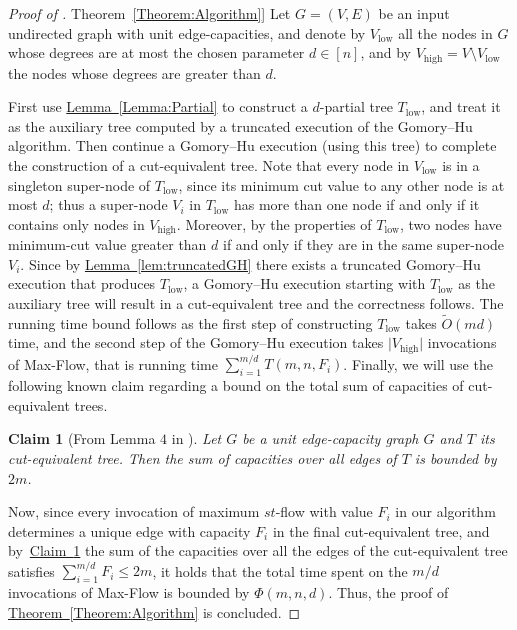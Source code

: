 \documentclass[11pt]{article}
\numberwithin{equation}{section}
\newtheorem{claim}[theorem]{Claim}
\theoremstyle{definition}
\theoremstyle{plain}
\newcommand{\expref}[2]{\hyperref[#2]{#1~\ref{#2}}}
\theoremstyle{plain}
\newcommand{\ProblemName}[1]{\textsf{#1}}
\newcommand{\MF}{\ProblemName{Max-Flow}\xspace}
\newcommand\tO{\ensuremath{\widetilde O}}  %
\providecommand{\card}[1]{\lvert#1\rvert}
\begin{document}
\begin{proof}[Proof of \expref{Theorem}{Theorem:Algorithm}]
Let $G=(V,E)$ be an input undirected graph with unit edge-capacities,
and denote by $V_{\mathrm{low}}$ all the nodes in $G$ whose degrees are at most
the chosen parameter $d\in [n]$,
and by $V_{\mathrm{high}}=V\setminus V_{\mathrm{low}}$ the nodes whose degrees are greater than $d$.

First use \expref{Lemma}{Lemma:Partial} to construct a $d$-partial tree $T_{\mathrm{low}}$,
and treat it as the auxiliary tree computed by a truncated execution
of the Gomory--Hu algorithm.
Then continue a Gomory--Hu execution (using this tree)
to complete the construction of a cut-equivalent tree.
Note that every node in $V_{\mathrm{low}}$ is in a singleton super-node of $T_{\mathrm{low}}$, since its minimum cut value to any other node is at most $d$; thus a super-node $V_i$ in $T_{\mathrm{low}}$ has more than one node if and only if it contains only nodes in $V_{\mathrm{high}}$.
Moreover, by the properties of $T_{\mathrm{low}}$, two nodes have minimum-cut value greater than $d$ if and only if they are in the same super-node $V_i$.
Since by \expref{Lemma}{lem:truncatedGH} there exists a truncated Gomory--Hu execution that produces $T_{\mathrm{low}}$, a Gomory--Hu execution starting with $T_{\mathrm{low}}$ as the auxiliary tree will result in a cut-equivalent tree and the correctness follows.
The running time bound follows as the first step of constructing $T_{\mathrm{low}}$ takes $\tO( m d )$ time,
and the second step of the Gomory--Hu execution
takes $\card{V_{\mathrm{high}}}$ invocations of \MF, that is running time $\sum_{i=1}^{m/d}T(m,n,F_i)$.
Finally, we will use the following known claim regarding a bound on the total sum of capacities of cut-equivalent trees.
\begin{claim}[From Lemma $4$ in \cite{BHKP07}]\label{tree_bound}
Let $G$ be a unit edge-capacity graph $G$ and $T$ its cut-equivalent tree. Then the sum of capacities over all edges of $T$ is bounded by $2m$.
\end{claim}
Now, since every invocation of maximum $st$-flow with value $F_i$ in our algorithm determines a unique edge with capacity $F_i$ in the final cut-equivalent tree, and by~\expref{Claim}{tree_bound} the sum of the capacities over all the edges of the cut-equivalent tree satisfies
$\sum_{i=1}^{m/d} F_i\leq 2m$,
it holds that the total time spent on the $m/d$ invocations of \MF is bounded by $\Phi(m,n,d)$.
Thus, the proof of \expref{Theorem}{Theorem:Algorithm} is concluded.
\end{proof}
\end{document}
